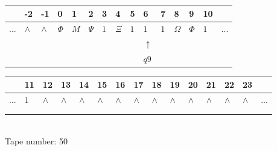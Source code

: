 \documentclass[11pt]{article}
\begin{document}
\begin{table}[H]
\centering
\begin{tabular}{lllllllllllllll}
 & -2 & -1 & 0 & 1 & 2 & 3 & 4 & 5 & 6 & 7 & 8 & 9 & 10 & \\
\hline
$...$ & \multicolumn{1}{|l|}{$\wedge$} & \multicolumn{1}{|l|}{$\wedge$} & \multicolumn{1}{|l|}{$\Phi$} & \multicolumn{1}{|l|}{$M$} & \multicolumn{1}{|l|}{$\Psi$} & \multicolumn{1}{|l|}{$1$} & \multicolumn{1}{|l|}{$\Xi$} & \multicolumn{1}{|l|}{$1$} & \multicolumn{1}{|l|}{$1$} & \multicolumn{1}{|l|}{$1$} & \multicolumn{1}{|l|}{$\Omega$} & \multicolumn{1}{|l|}{$\Phi$} & \multicolumn{1}{|l|}{$1$} & $...$\\
\hline
&  &  &  &  &  &  &  &  & $\uparrow$ &  &  &  &  &  \\
&  &  &  &  &  &  &  &  & $ q9 $ &  &  &  &  &  \\
\end{tabular}
\begin{tabular}{lllllllllllllll}
 & 11 & 12 & 13 & 14 & 15 & 16 & 17 & 18 & 19 & 20 & 21 & 22 & 23 & \\
\hline
$...$ & \multicolumn{1}{|l|}{$1$} & \multicolumn{1}{|l|}{$\wedge$} & \multicolumn{1}{|l|}{$\wedge$} & \multicolumn{1}{|l|}{$\wedge$} & \multicolumn{1}{|l|}{$\wedge$} & \multicolumn{1}{|l|}{$\wedge$} & \multicolumn{1}{|l|}{$\wedge$} & \multicolumn{1}{|l|}{$\wedge$} & \multicolumn{1}{|l|}{$\wedge$} & \multicolumn{1}{|l|}{$\wedge$} & \multicolumn{1}{|l|}{$\wedge$} & \multicolumn{1}{|l|}{$\wedge$} & \multicolumn{1}{|l|}{$\wedge$} & $...$\\
\hline
&  &  &  &  &  &  &  &  &  &  &  &  &  &  \\
&  &  &  &  &  &  &  &  &  &  &  &  &  &  \\
\end{tabular}
\\
Tape number: 50
\noindent\makebox[\linewidth]{\hdashrule{\textwidth}{1pt}{1pt}}\end{table}
\end{document}

